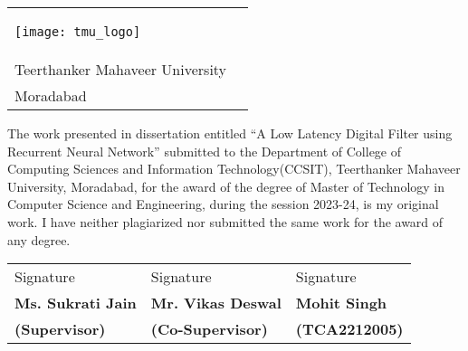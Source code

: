 \begin{tabularx}{\textwidth}{>{\hsize=0.5\hsize}XX}
	\begin{flushleft}
		\texttt{[image: tmu\_logo]}
	\end{flushleft} & \begin{center}
		\vspace{2\baselineskip}
		\Large College of Computing Sciences \& Information Technology\\Teerthanker Mahaveer University\\Moradabad
	\end{center}
\end{tabularx}
\vspace{2\baselineskip}

\large The work presented in dissertation entitled ``A Low Latency Digital Filter using Recurrent Neural Network'' submitted to the Department of College of Computing Sciences and Information Technology(CCSIT), Teerthanker Mahaveer University, Moradabad, for the award of the degree of Master of Technology in Computer Science and Engineering, during the session 2023-24, is my original work. I have neither plagiarized nor submitted the same work for the award of any degree.
\vspace{4\baselineskip}

\noindent
\begin{tabularx}{\textwidth}{MMM}
	Signature & Signature & Signature\\
	\textbf{Ms. Sukrati Jain} & \textbf{Mr. Vikas Deswal} & \textbf{Mohit Singh}\\
	\textbf{(Supervisor)} & \textbf{(Co-Supervisor)} & \textbf{(TCA2212005)}\\
\end{tabularx}
\clearpage